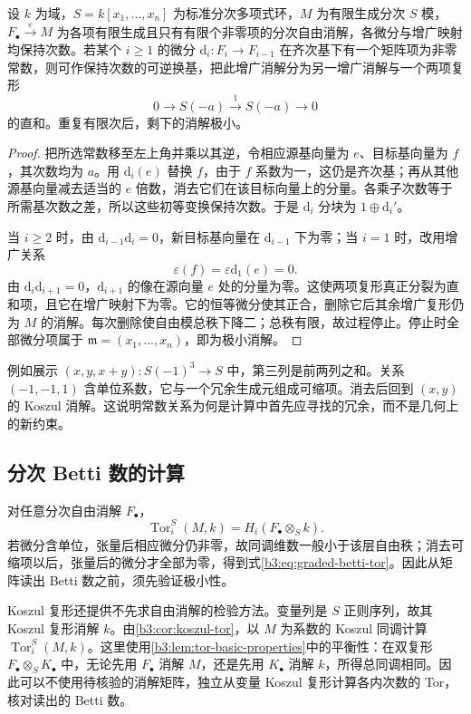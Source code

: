 \begin{proposition}\label{b3:prop:graded-cancellation}
	设 \(k\) 为域，\(S=k[x_1,\ldots,x_n]\) 为标准分次多项式环，\(M\) 为有限生成分次 \(S\) 模，\(F_\bullet\xrightarrow{\varepsilon} M\) 为各项有限生成且只有有限个非零项的分次自由消解，各微分与增广映射均保持次数。若某个 \(i\ge1\) 的微分 \(\mathrm{d}_i:F_i\rightarrow F_{i-1}\) 在齐次基下有一个矩阵项为非零常数，则可作保持次数的可逆换基，把此增广消解分为另一增广消解与一个两项复形
	\[
		0\longrightarrow S(-a)\xrightarrow{1}S(-a)\longrightarrow0
	\]
	的直和。重复有限次后，剩下的消解极小。
\end{proposition}
\begin{proof}
	把所选常数移至左上角并乘以其逆，令相应源基向量为 \(e\)、目标基向量为 \(f\)，其次数均为 \(a\)。用 \(\mathrm{d}_i(e)\) 替换 \(f\)，由于 \(f\) 系数为一，这仍是齐次基；再从其他源基向量减去适当的 \(e\) 倍数，消去它们在该目标向量上的分量。各乘子次数等于所需基次数之差，所以这些初等变换保持次数。于是 \(\mathrm{d}_i\) 分块为 \(1\oplus \mathrm{d}_i'\)。

	当 \(i\ge2\) 时，由 \(\mathrm{d}_{i-1}\mathrm{d}_i=0\)，新目标基向量在 \(\mathrm{d}_{i-1}\) 下为零；当 \(i=1\) 时，改用增广关系
	\[
		\varepsilon(f)=\varepsilon\mathrm{d}_1(e)=0.
	\]
	由 \(\mathrm{d}_i\mathrm{d}_{i+1}=0\)，\(\mathrm{d}_{i+1}\) 的像在源向量 \(e\) 处的分量为零。这使两项复形真正分裂为直和项，且它在增广映射下为零。它的恒等微分使其正合，删除它后其余增广复形仍为 \(M\) 的消解。每次删除使自由模总秩下降二；总秩有限，故过程停止。停止时全部微分项属于 \(\mathfrak m=(x_1,\ldots,x_n)\)，即为极小消解。
\end{proof}

例如展示 \((x,y,x+y):S(-1)^3\rightarrow S\) 中，第三列是前两列之和。关系 \((-1,-1,1)\) 含单位系数，它与一个冗余生成元组成可缩项。消去后回到 \((x,y)\) 的 Koszul 消解。这说明常数关系为何是计算中首先应寻找的冗余，而不是几何上的新约束。

\subsection{分次 Betti 数的计算}
\label{b3:subsec:2105:02}

对任意分次自由消解 \(F_\bullet\)，
\[
	\operatorname{Tor}_i^S(M,k)=H_i(F_\bullet\otimes_Sk).
\]
若微分含单位，张量后相应微分仍非零，故同调维数一般小于该层自由秩；消去可缩项以后，张量后的微分才全部为零，得到式\eqref{b3:eq:graded-betti-tor}。因此从矩阵读出 Betti 数之前，须先验证极小性。

\ProseParagraphBreak
Koszul 复形还提供不先求自由消解的检验方法。变量列是 \(S\) 正则序列，故其 Koszul 复形消解 \(k\)。由\cref{b3:cor:koszul-tor}，以 \(M\) 为系数的 Koszul 同调计算 \(\operatorname{Tor}_i^S(M,k)\)。这里使用\cref{b3:lem:tor-basic-properties}中的平衡性：在双复形 \(F_\bullet\otimes_SK_\bullet\) 中，无论先用 \(F_\bullet\) 消解 \(M\)，还是先用 \(K_\bullet\) 消解 \(k\)，所得总同调相同。因此可以不使用待核验的消解矩阵，独立从变量 Koszul 复形计算各内次数的 Tor，核对读出的 Betti 数。

